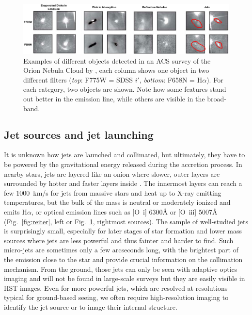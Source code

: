 \documentclass[12pt]{article}
\begin{document}
\begin{figure}
    \centering
    \includegraphics[width=\textwidth]{hst_disks_v4.pdf}
    \caption{Examples of different objects detected in an ACS survey of the Orion Nebula Cloud by \citet{2008AJ....136.2136R}, each column shows one object in two different filters (\emph{top}: F775W = SDSS $i'$, \emph{bottom}: F658N = H$\alpha$). For each category, two objects are shown. Note how some features stand out better in the emission line, while others are visible in the broad-band.}
    \label{fig:ONCACS}
\end{figure}

\subsection{Jet sources and jet launching}
It is unknown how jets are launched and collimated, but ultimately, they have
to be powered by the gravitational energy released during the accretion process. In
nearby stars, jets are layered like an onion where slower, outer layers are
surrounded by hotter and faster layers inside \citep{1993ApJ...409..748G,2000ApJ...537L..49B}. The
innermost layers can reach a few 1000~km/s for jets from massive stars and heat
up to X-ray emitting temperatures, but the bulk of the mass is neutral or
moderately ionized and emits H$\alpha$, or optical emission lines such as
[O~{\sc i}] 6300\AA{} or [O~{\sc iii}] 5007\AA{} (Fig.~\ref{fig:reiter},
left or Fig.~\ref{fig:ONCACS}, rightmost sources). The sample of well-studied jets is surprisingly small, especially for
later stages of star formation and lower mass sources where jets are less
powerful and thus fainter and harder to find. Such micro-jets are sometimes
only a few arcseconds long, with the brightest part of the emission close to
the star and provide crucial information on the collimation mechanism. From the ground, those jets can only be seen with adaptive optics
imaging and will not be found in large-scale surveys but they are easily
visible in HST images. Even for more powerful jets, which are resolved at
resolutions typical for ground-based seeing, we often require high-resolution
imaging to identify the jet source or to image their internal structure.
\end{document}
